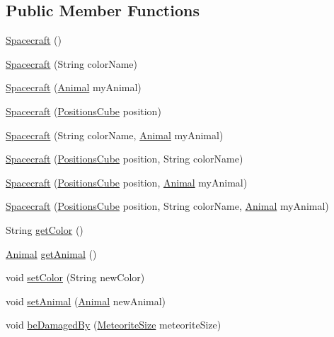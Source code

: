 \subsection*{Public Member Functions}
\begin{DoxyCompactItemize}
\item 
\hyperlink{classspace_objects_1_1_spacecraft_afc5d312686349bb5b6be07147c75a06f}{Spacecraft} ()
\item 
\hyperlink{classspace_objects_1_1_spacecraft_af56e1777de0c0971bedb3d6267a7ad47}{Spacecraft} (String color\+Name)
\item 
\hyperlink{classspace_objects_1_1_spacecraft_a807f3b576f0bf90a479abfb981436b50}{Spacecraft} (\hyperlink{classanimal_package_1_1_animal}{Animal} my\+Animal)
\item 
\hyperlink{classspace_objects_1_1_spacecraft_ab900e40cfb8a82b321ad13965be6648e}{Spacecraft} (\hyperlink{enumspace_objects_1_1_positions_cube}{Positions\+Cube} position)
\item 
\hyperlink{classspace_objects_1_1_spacecraft_a9db198d1055593715c098d74f229be40}{Spacecraft} (String color\+Name, \hyperlink{classanimal_package_1_1_animal}{Animal} my\+Animal)
\item 
\hyperlink{classspace_objects_1_1_spacecraft_a02713987b23056b42305b3b6753bd1b4}{Spacecraft} (\hyperlink{enumspace_objects_1_1_positions_cube}{Positions\+Cube} position, String color\+Name)
\item 
\hyperlink{classspace_objects_1_1_spacecraft_a34281ab0c2d1da3bdbc81b1481a3a29b}{Spacecraft} (\hyperlink{enumspace_objects_1_1_positions_cube}{Positions\+Cube} position, \hyperlink{classanimal_package_1_1_animal}{Animal} my\+Animal)
\item 
\hyperlink{classspace_objects_1_1_spacecraft_a54fd74aeec6f9dc097aa92524f58af6d}{Spacecraft} (\hyperlink{enumspace_objects_1_1_positions_cube}{Positions\+Cube} position, String color\+Name, \hyperlink{classanimal_package_1_1_animal}{Animal} my\+Animal)
\item 
String \hyperlink{classspace_objects_1_1_spacecraft_ae14b76cc33b3712ef74d9655a17857a4}{get\+Color} ()
\item 
\hyperlink{classanimal_package_1_1_animal}{Animal} \hyperlink{classspace_objects_1_1_spacecraft_a222fe78ba5176e37ddbb23ca9d9e4798}{get\+Animal} ()
\item 
void \hyperlink{classspace_objects_1_1_spacecraft_ad0c1108b415608dc3022109ab9195808}{set\+Color} (String new\+Color)
\item 
void \hyperlink{classspace_objects_1_1_spacecraft_a031b32b5068351e6cabcbe097fab8ecd}{set\+Animal} (\hyperlink{classanimal_package_1_1_animal}{Animal} new\+Animal)
\item 
void \hyperlink{classspace_objects_1_1_spacecraft_a12edce1bf691de8c2522620baf603df8}{be\+Damaged\+By} (\hyperlink{enumspace_objects_1_1_meteorite_size}{Meteorite\+Size} meteorite\+Size)
\end{DoxyCompactItemize}
